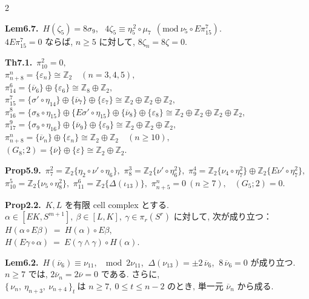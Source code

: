 \documentclass[10pt, leqno]{ltjsarticle}
\newcommand{\ov}[1]{\overline{#1}}
\newcommand{\todai}[2][]{\{\,#2\,\}_{#1}}      %
\newcommand{\gen}[1]{\{#1\}}       %
\newcommand{\pit}[2]{\pi_{#1}^{#2}}
\numberwithin{equation}{section}
\theoremstyle{plain}
\theoremstyle{definition}
\theoremstyle{remark}
\begin{document}
\begin{paracol}{2}
\switchcolumn

\noindent
\textbf{Lem6.7.}\
\(H(\zeta_{5})=8\sigma_{9}\), \
\(4\zeta_{5}\equiv \eta_{5}^{\,2}\circ \mu_{7}\ \ (\mathrm{mod}\ \nu_{5}\circ E\pi^{7}_{15})\).\\
\(4E\pit{15}{7} = 0\) ならば, \(n\ge5\) に対して, \(8\zeta_n=8\zeta=0\).

\noindent
\textbf{Th7.1.}\
\(\pit{10}{2}=0,\)\\
\(\pit{n+8}{n}=\gen{\varepsilon_{n}}\cong\mathbb Z_{2}\quad (n=3,4,5),\)\\
\(\pit{14}{6}=\gen{\ov\nu_{6}}\oplus\gen{\varepsilon_{6}}\cong\mathbb Z_{8}\oplus\mathbb Z_{2},\)\\
\(\pit{15}{7}=\gen{\sigma'\circ\eta_{14}}\oplus\gen{\ov{\nu}_{7}}\oplus\gen{\varepsilon_{7}}\cong \mathbb Z_{2}\oplus\mathbb Z_{2}\oplus\mathbb Z_{2},\)\\
\(\pit{16}{8}=\gen{\sigma_{8}\circ\eta_{15}}\oplus\gen{E\sigma'\circ\eta_{15}}\oplus\gen{\ov{\nu}_{8}}\oplus\gen{\varepsilon_{8}}\cong \mathbb Z_{2}\oplus\mathbb Z_{2}\oplus\mathbb Z_{2}\oplus\mathbb Z_{2},\)\\
\(\pit{17}{9}=\gen{\sigma_{9}\circ\eta_{16}}\oplus\gen{\ov{\nu}_{9}}\oplus\gen{\varepsilon_{9}}\cong \mathbb Z_{2}\oplus\mathbb Z_{2}\oplus\mathbb Z_{2},\)\\
\(\pit{n+8}{n}=\gen{\ov{\nu}_{n}}\oplus\gen{\varepsilon_{n}}\cong \mathbb Z_{2}\oplus\mathbb Z_{2}\quad (n\ge10),\)\\
\((G_{8};2)=\gen{\ov{\nu}}\oplus\gen{\varepsilon}\cong\mathbb Z_{2}\oplus\mathbb Z_{2}.\)

\noindent
\textbf{Prop5.9.}\
\(\pi^{2}_{7}=\mathbb Z_2\gen{\eta_{2}\circ\nu'\circ\eta_6},\) \quad
\(\pi^{3}_{8}=\mathbb Z_2\gen{\nu'\circ\eta_6^2},\) \quad
\(\pi^{4}_{9}=\mathbb Z_2\gen{\nu_{4}\circ\eta_7^2}\oplus \mathbb Z_2\gen{E\nu'\circ\eta_7^2},\) \\
\(\pi^{5}_{10}=\mathbb Z_2\gen{\nu_{5}\circ\eta_8^2},\) \quad
\(\pi^{6}_{11}=\mathbb Z_2\gen{\Delta(\iota_{13})},\) \quad
\(\pi^{n}_{n+5}=0\ (n\ge7),\) \
\((G_{5};2)=0.\)

\noindent
\textbf{Prop2.2.}\
$K,L$ を有限 cell complex とする. \\
$\alpha\in[EK, S^{m+1}], \ \beta\in[L,K], \ \gamma\in\pi_r(S^r)$ 
に対して, 次が成り立つ：\\
\(
H(\alpha\circ E\beta)\ =\ H(\alpha)\circ E\beta,
\)\\
\(
H(E\gamma\circ\alpha)\ =\ E(\gamma\wedge\gamma)\circ H(\alpha).
\)

\noindent
\textbf{Lem6.2.}\
\(H(\overline{\nu}_6)\equiv\nu_{11},\ \mod 2\nu_{11}\text{}\), 
\(\ \Delta(\nu_{13})=\pm 2\,\overline{\nu}_6\), 
\(\ 8\,\overline{\nu}_6=0\) が成り立つ. \\
\(n\ge7\) では,
\(2\overline{\nu}_n=2\overline{\nu}=0\) である. さらに,\\
\(
\todai[t]{\nu_n,\ \eta_{n+3},\ \nu_{n+4}}\ \text{は }n\ge7,\ 
0\le t\le n-2\text{ のとき, 単一元 }\overline{\nu}_n\text{ から成る. }
\)


\end{paracol}
\end{document}
